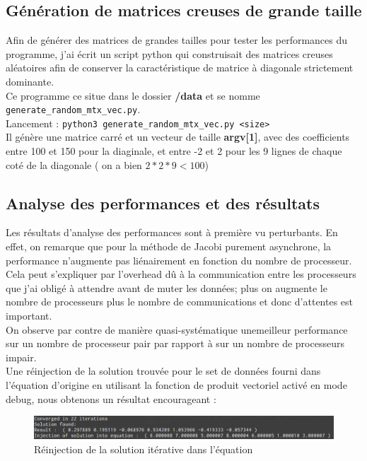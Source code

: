 \documentclass[11pt, a4paper]{article}
\begin{document}
\subsection{Génération de matrices creuses de grande taille}

Afin de générer des matrices de grandes tailles pour tester les performances du programme, j'ai écrit un script python qui construisait des matrices creuses aléatoires afin de conserver la caractéristique de matrice à diagonale strictement dominante.\\

Ce programme ce situe dans le dossier \textbf{/data} et se nomme \texttt{generate\_random\_mtx\_vec.py}.\\

Lancement : \texttt{python3 generate\_random\_mtx\_vec.py <size>}\\

Il génère une matrice carré et un vecteur de taille \textbf{argv[1]}, avec des coefficients entre 100 et 150 pour la diaginale, et entre -2 et 2 pour les 9 lignes de chaque coté de la diagonale ( on a bien $2*2*9 < 100 $)

\subsection{Analyse des performances et des résultats}

Les résultats d'analyse des performances sont à première vu perturbants. En effet, on remarque que pour la méthode de Jacobi purement asynchrone, la performance n'augmente  pas liénairement en fonction du nombre de processeur.\\

Cela peut s'expliquer par l'overhead d\^u à la communication entre les processeurs que j'ai obligé à attendre avant de muter les données; plus on augmente le nombre de processeurs plus le nombre de communications et donc d'attentes est important.\\

On observe par contre de manière quasi-systématique unemeilleur performance sur un nombre de processeur pair par rapport à sur un nombre de processeurs impair.\\

Une réinjection de la solution trouvée pour le set de données fourni dans l'équation d'origine en utilisant la fonction de produit vectoriel activé en mode debug, nous obtenons un résultat encourageant :

\begin{figure}[h]
    \centering
    \includegraphics[width=350pt]{convergence.png}
    \caption{Réinjection de la solution itérative dans l'équation}
\end{figure}
\end{document}
